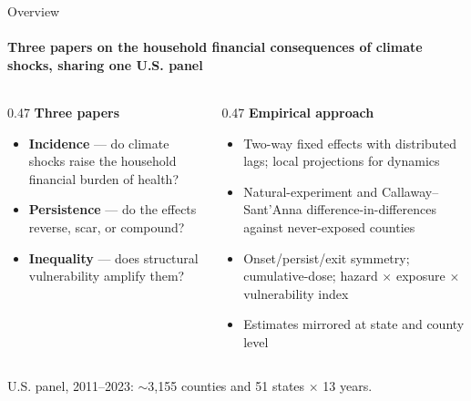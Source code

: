 \documentclass[aspectratio=169,11pt]{beamer}
\newcommand{\emphcolor}[1]{{\color{WarmOrange}\textbf{#1}}}
\newcommand{\tealtext}[1]{{\color{Teal}#1}}
\newcommand{\graytext}[1]{{\color{WarmGray}#1}}
\begin{document}
\begin{frame}{Overview}
  \framesubtitle{Three papers on the household financial consequences of climate shocks, sharing one U.S. panel}
  \begin{columns}[T]
    \begin{column}{0.47\textwidth}
      \textbf{\tealtext{Three papers}}
      \begin{itemize}\itemsep0.18em
        \item \emphcolor{Incidence} --- do climate shocks raise the household financial burden of health?
        \item \emphcolor{Persistence} --- do the effects reverse, scar, or compound?
        \item \emphcolor{Inequality} --- does structural vulnerability amplify them?
      \end{itemize}
    \end{column}
    \begin{column}{0.47\textwidth}
      \textbf{\tealtext{Empirical approach}}
      \begin{itemize}\itemsep0.18em
        \item Two-way fixed effects with distributed lags; local projections for dynamics
        \item Natural-experiment and Callaway--Sant'Anna difference-in-differences against never-exposed counties
        \item Onset/persist/exit symmetry; cumulative-dose; hazard \(\times\) exposure \(\times\) vulnerability index
        \item Estimates mirrored at state and county level
      \end{itemize}
    \end{column}
  \end{columns}
  \vspace{0.2em}
  \begin{center}
    \graytext{\scriptsize U.S. panel, 2011--2023: $\sim$3{,}155 counties and 51 states $\times$ 13 years.}
  \end{center}
\end{frame}
\end{document}
